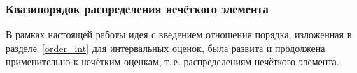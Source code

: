 \subsubsection{Квазипорядок распределения нечёткого элемента}
\label{preorder_pyt}

В рамках настоящей работы идея с введением отношения порядка, изложенная в разделе~\ref{order_int} для интервальных оценок, была развита и продолжена применительно к нечётким оценкам, т.\,е. распределениям нечёткого элемента. 

